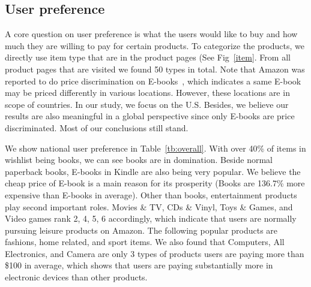 \subsection{User preference}
A core question on user preference is what the users would like to buy and how much they are willing to pay for certain products. To categorize the products, we directly use item type that are in the product pages (See Fig~\ref{item}. From all product pages that are visited we found 50 types in total. Note that Amazon was reported to do price discrimination on E-books~\cite{mikians2012detecting}, which indicates a same E-book may be priced differently in various locations. However, these locations are in scope of countries. In our study, we focus on the U.S. Besides, we believe our results are also meaningful in a global perspective since only E-books are price discriminated. Most of our conclusions still stand.

We show national user preference in Table~\ref{tb:overall}. With over 40\% of items in wishlist being books, we can see books are in domination. Beside normal paperback books, E-books in Kindle are also being very popular. We believe the cheap price of E-book is a main reason for its prosperity (Books are 136.7\% more expensive than E-books in average). Other than books, entertainment products play second important roles. Movies \& TV, CDs \& Vinyl, Toys \& Games, and Video games rank 2, 4, 5, 6 accordingly, which indicate that users are normally pursuing leisure products on Amazon. The following popular products are fashions, home related, and sport items. We also found that Computers, All Electronics, and Camera are only 3 types of products users are paying more than \$100 in average, which shows that users are paying substantially more in electronic devices than other products.


